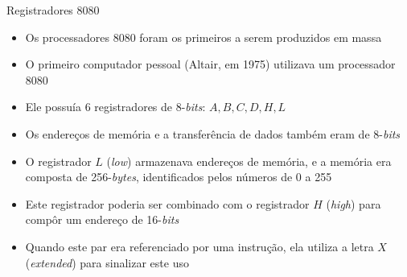 \begin{frame}[fragile]{Registradores 8080}

    \begin{itemize}
        \item Os processadores 8080 foram os primeiros a serem produzidos em massa

        \item O primeiro computador pessoal (Altair, em 1975) utilizava um processador 8080

        \item Ele possuía 6 registradores de 8-\textit{bits}: $A, B, C, D, H, L$ 

        \item Os endereços de memória e a transferência de dados também eram de 8-\textit{bits}

        \item O registrador $L$ (\textit{low}) armazenava endereços de memória, e a memória era 
            composta de 256-\textit{bytes}, identificados pelos números de 0 a 255

        \item Este registrador poderia ser combinado com o registrador $H$ (\textit{high}) para
            compôr um endereço de 16-\textit{bits}

        \item Quando este par era referenciado por uma instrução, ela utiliza a letra $X$ 
            (\textit{extended}) para sinalizar este uso
    \end{itemize}

\end{frame}

